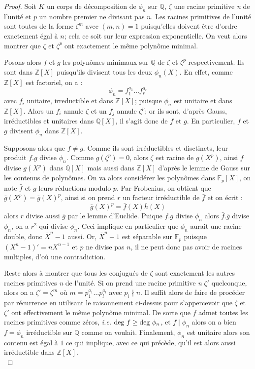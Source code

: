 \documentclass[a4paper]{article} %
\numberwithin{equation}{section}
\newcommand\nroot[1]{\textit{#1}\up{\textit{ième}}}
\newcommand\GF[1]{\mathbb{F}_{#1}}
\begin{document}
\begin{proof}
Soit $K$ un corps de décomposition de $\phi_n$ sur $\mathbb{Q}$, $\zeta$ une racine primitive \nroot{n} de l'unité et $p$ un nombre premier ne divisant pas $n$. Les racines primitives de l'unité sont toutes de la forme $\zeta^m$ avec $(m, n) = 1$ puisqu'elles doivent être d'ordre exactement égal à $n$; cela ce soit sur leur expression exponentielle. On veut alors montrer que $\zeta$ et $\zeta^p$ ont exactement le même polynôme minimal.\par
Posons alors $f$ et $g$ les polynômes minimaux sur $\mathbb{Q}$ de $\zeta$ et $\zeta^p$ respectivement. Ils sont dans $\mathbb{Z}[X]$ puisqu'ils divisent tous les deux $\phi_n(X)$. En effet, comme $\mathbb{Z}[X]$ est factoriel, on a :
\[\phi_n = f_1^{a_1}\dots f_r^{a_r}\]
 avec $f_i$ unitaire, irreductible et dans $\mathbb{Z}[X]$; puisque $\phi_n$ est unitaire et dans $\mathbb{Z}[X]$. Alors un $f_i$ annule $\zeta$ et un $f_j$ annule $\zeta^p$; or ils sont, d'après Gauss, irréductibles et unitaires dans $\mathbb{Q}[X]$, il s'agit donc de $f$ et $g$. En particulier, $f$ et $g$ divisent $\phi_n$ dans $\mathbb{Z}[X]$.\par
Supposons alors que $f \neq g$. Comme ils sont irréductibles et disctincts, leur produit $f.g$ divise $\phi_n$. Comme $g(\zeta^p) = 0$, alors $\zeta$ est racine de $g(X^p)$, ainsi $f$ divise $g(X^p)$ dans $\mathbb{Q}[X]$ mais aussi dans $\mathbb{Z}[X]$ d'après le lemme de Gauss sur les contenus de polynômes. On va alors considérer les polynômes dans $\GF{p}[X]$, on note $\bar{f}$ et $\bar{g}$ leurs réductions modulo $p$. Par Frobenius, on obtient que $\bar{g}(X^p) = \bar{g}(X)^p$, ainsi si on prend $r$ un facteur irréductible de $\bar{f}$ et on écrit :
\[\bar{g}(X)^p = \bar{f}(X)\bar{h}(X)\]
alors $r$ divise aussi $\bar{g}$ par le lemme d'Euclide. Puique $f.g$ divise $\phi_n$ alors $\bar{f}.\bar{g}$ divise $\bar{\phi_n}$, on a $r^2$ qui divise $\bar{\phi_n}$. Ceci implique en particulier que $\bar{\phi_n}$ aurait une racine double, donc $\bar{X}^n - 1$ aussi. Or, $\bar{X}^n - 1$ est séparable sur $\GF{p}$ puisque $(X^n - 1)' = nX^{n-1}$ et $p$ ne divise pas $n$, il ne peut donc pas avoir de racines multiples, d'où une contradiction.\par
Reste alors à montrer que tous les conjugués de $\zeta$ sont exactement les autres racines primitives \nroot{n} de l'unité. Si on prend une racine primitive \nroot{n} $\zeta'$ quelconque, alors on a $\zeta' = \zeta^m$ où $m = p_1^{a_1}\dots p_l^{a_l}$ avec $p_i \nmid n$. Il suffit alors de faire de procéder par récurrence en utilisant le raisonnement ci-dessus pour s'appercevoir que $\zeta$ et $\zeta'$ ont effectivement le même polynôme minimal. De sorte que $f$ admet toutes les racines primitives comme zéros, \textit{i.e.} $\textup{deg~}f \geq \textup{deg~}\phi_n$, et $f\mid\phi_n$ alors on a bien $f = \phi_n$ irréductible sur $\mathbb{Q}$ comme on voulait. Finalement, $\phi_n$ est unitaire alors son contenu est égal à $1$ ce qui implique, avec ce qui précède, qu'il est alors aussi irréductible dans $\mathbb{Z}[X]$.\\
\end{proof}
\end{document}
